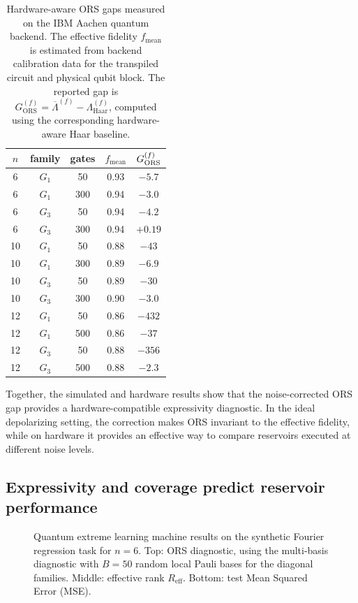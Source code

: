 \documentclass[
    aps,
    pre,
    amsmath,
    amssymb,
    reprint,
    superscriptaddress,
    preprintnumbers,
]{revtex4-2}
\begin{document}
\begin{table}[t]
\centering
\begin{tabular}{c c c c c}
\hline
$n$ & family & gates & $f_{\mathrm{mean}}$ & $G_{\rm ORS}^{(f)}$ \\
\hline
6  & $G_1$ & 50  & 0.93 & $-5.7$ \\
6  & $G_1$ & 300 & 0.94 & $-3.0$ \\
6  & $G_3$ & 50  & 0.94 & $-4.2$ \\
6  & $G_3$ & 300 & 0.94 & $+0.19$ \\
10 & $G_1$ & 50  & 0.88 & $-43$ \\
10 & $G_1$ & 300 & 0.89 & $-6.9$ \\
10 & $G_3$ & 50  & 0.89 & $-30$ \\
10 & $G_3$ & 300 & 0.90 & $-3.0$ \\
12 & $G_1$ & 50  & 0.86 & $-432$ \\
12 & $G_1$ & 500 & 0.86 & $-37$ \\
12 & $G_3$ & 50  & 0.88 & $-356$ \\
12 & $G_3$ & 500 & 0.88 & $-2.3$ \\
\hline
\end{tabular}
\caption{Hardware-aware ORS gaps measured on the IBM Aachen quantum backend. The effective fidelity $f_{\mathrm{mean}}$ is estimated from backend calibration data for the transpiled circuit and physical qubit block. The reported gap is $G_{\mathrm{ORS}}^{(f)}=\overline{\Lambda}^{(f)}-\Lambda_{\mathrm{Haar}}^{(f)}$, computed using the corresponding hardware-aware Haar baseline.}
\label{tab:ibm-aachen-ors}
\end{table}

Together, the simulated and hardware results show that the noise-corrected ORS gap provides a hardware-compatible expressivity diagnostic. In the ideal depolarizing setting, the correction makes ORS invariant to the effective fidelity, while on hardware it provides an effective way to compare reservoirs executed at different noise levels.

\subsection{Expressivity and coverage predict reservoir performance}
\label{sec:results-performance}

\begin{figure}[t]
\centering
\resizebox{0.9\textwidth}{!}{%
}
\caption{Quantum extreme learning machine results on the synthetic Fourier regression task for $n=6$. Top: ORS diagnostic, using the multi-basis diagnostic with $B=50$ random local Pauli bases for the diagonal families. Middle: effective rank $R_{\mathrm{eff}}$. Bottom: test Mean Squared Error (MSE).}
\label{fig:qelm-fourier-results}
\end{figure}
\end{document}
